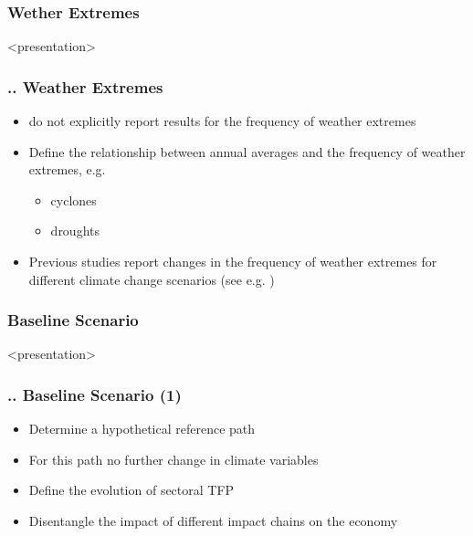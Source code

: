 \documentclass[11pt,aspectratio=169]{beamer}
\begin{document}
\subsubsection{Wether Extremes}
\begin{frame}<presentation>
	\frametitle{{\thesection.\thesubsection.\thesubsubsection} Weather Extremes}
	\begin{itemize}
		\item \cite{thuc2016climate} do not explicitly report results for the frequency of weather extremes
		\item Define the relationship between annual averages and the frequency of weather extremes, e.g. 
			\begin{itemize}
				\item cyclones
				\item droughts
			\end{itemize}
		\item Previous studies report changes in the frequency of weather extremes for different climate change scenarios (see e.g. \cite{arndt2015economic})
	\end{itemize}
\end{frame}

\subsubsection{Baseline Scenario}
\begin{frame}<presentation>
	\frametitle{{\thesection.\thesubsection.\thesubsubsection} Baseline Scenario (1)}
	\begin{itemize}
		\item Determine a hypothetical reference path
		\item For this path no further change in climate variables
		\item Define the evolution of sectoral TFP
		\item Disentangle the impact of different impact chains on the economy
	\end{itemize}
\end{frame}
\end{document}
